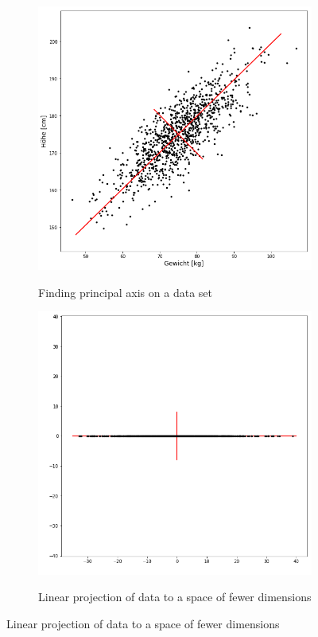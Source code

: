 \documentclass{beamer}
\theoremstyle{plain}
\theoremstyle{definition}
\begin{document}
\begin{frame}
\begin{figure}
\centering
	\begin{subfigure}{0.45\textwidth}
	\centering
	\captionsetup{justification=centering}
	\includegraphics[width = \textwidth]{figures/pca_example.png}
	\label{pca_example_original}
	\caption{Finding principal axis on a data set}
	\end{subfigure}
	\begin{subfigure}{0.45\textwidth}
	\centering
	\captionsetup{justification=centering}
	\includegraphics[width = \textwidth]{figures/pca_example_rotated.png}
	\label{pca_example_rotated}
	\caption{Linear projection of data to a space of fewer dimensions}
	\end{subfigure}

\label{pca_example}
\end{figure}
\end{frame}
\end{document}
